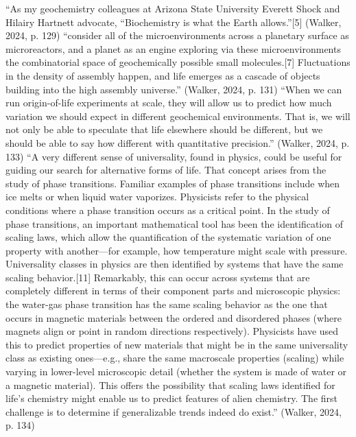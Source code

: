 \markdownRendererUlItem “As my geochemistry colleagues at Arizona State University Everett Shock and Hilairy Hartnett advocate, “Biochemistry is what the Earth allows.”[5] (Walker, 2024, p. 129)\markdownRendererUlItemEnd 
\markdownRendererUlItem “consider all of the microenvironments across a planetary surface as microreactors, and a planet as an engine exploring via these microenvironments the combinatorial space of geochemically possible small molecules.[7] Fluctuations in the density of assembly happen, and life emerges as a cascade of objects building into the high assembly universe.” (Walker, 2024, p. 131)\markdownRendererUlItemEnd 
\markdownRendererUlItem “When we can run origin-of-life experiments at scale, they will allow us to predict how much variation we should expect in different geochemical environments. That is, we will not only be able to speculate that life elsewhere should be different, but we should be able to say how different with quantitative precision.” (Walker, 2024, p. 133)\markdownRendererUlItemEnd 
\markdownRendererUlItem “A very different sense of universality, found in physics, could be useful for guiding our search for alternative forms of life. That concept arises from the study of phase transitions. Familiar examples of phase transitions include when ice melts or when liquid water vaporizes. Physicists refer to the physical conditions where a phase transition occurs as a critical point. In the study of phase transitions, an important mathematical tool has been the identification of scaling laws, which allow the quantification of the systematic variation of one property with another—for example, how temperature might scale with pressure. Universality classes in physics are then identified by systems that have the same scaling behavior.[11] Remarkably, this can occur across systems that are completely different in terms of their component parts and microscopic physics: the water-gas phase transition has the same scaling behavior as the one that occurs in magnetic materials between the ordered and disordered phases (where magnets align or point in random directions respectively). Physicists have used this to predict properties of new materials that might be in the same universality class as existing ones—e.g., share the same macroscale properties (scaling) while varying in lower-level microscopic detail (whether the system is made of water or a magnetic material). This offers the possibility that scaling laws identified for life’s chemistry might enable us to predict features of alien chemistry. The first challenge is to determine if generalizable trends indeed do exist.” (Walker, 2024, p. 134)\markdownRendererUlItemEnd 
